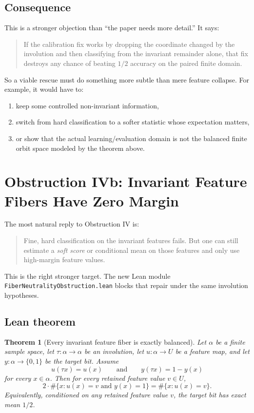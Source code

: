 \documentclass[11pt]{article}
\newtheorem{theorem}{Theorem}[section]
\theoremstyle{remark}
\begin{document}
\subsection{Consequence}

This is a stronger objection than ``the paper needs more detail.''  It says:

\begin{quote}
If the calibration fix works by dropping the coordinate changed by the involution and then
classifying from the invariant remainder alone, that fix destroys any chance of beating
\(1/2\) accuracy on the paired finite domain.
\end{quote}

So a viable rescue must do something more subtle than mere feature collapse.  For example, it
would have to:
\begin{enumerate}[leftmargin=1.5em]
  \item keep some controlled non-invariant information,
  \item switch from hard classification to a softer statistic whose expectation matters,
  \item or show that the actual learning/evaluation domain is not the balanced finite orbit space
  modeled by the theorem above.
\end{enumerate}

\section{Obstruction IVb: Invariant Feature Fibers Have Zero Margin}

The most natural reply to Obstruction IV is:
\begin{quote}
Fine, hard classification on the invariant features fails.  But one can still estimate a
\emph{soft score} or conditional mean on those features and only use high-margin feature values.
\end{quote}

This is the right stronger target.  The new Lean module
\texttt{FiberNeutralityObstruction.lean} blocks that repair under the same involution
hypotheses.

\subsection{Lean theorem}

\begin{theorem}[Every invariant feature fiber is exactly balanced]
Let \(\alpha\) be a finite sample space, let \(\tau : \alpha \to \alpha\) be an involution, let
\(u : \alpha \to U\) be a feature map, and let \(y : \alpha \to \{0,1\}\) be the target bit.
Assume
\[
  u(\tau x) = u(x)
  \qquad\text{and}\qquad
  y(\tau x) = 1 - y(x)
\]
for every \(x \in \alpha\).  Then for every retained feature value \(v \in U\),
\[
  2 \cdot \#\{x : u(x)=v \text{ and } y(x)=1\}
  =
  \#\{x : u(x)=v\}.
\]
Equivalently, conditioned on any retained feature value \(v\), the target bit has exact mean
\(1/2\).
\end{theorem}
\end{document}
